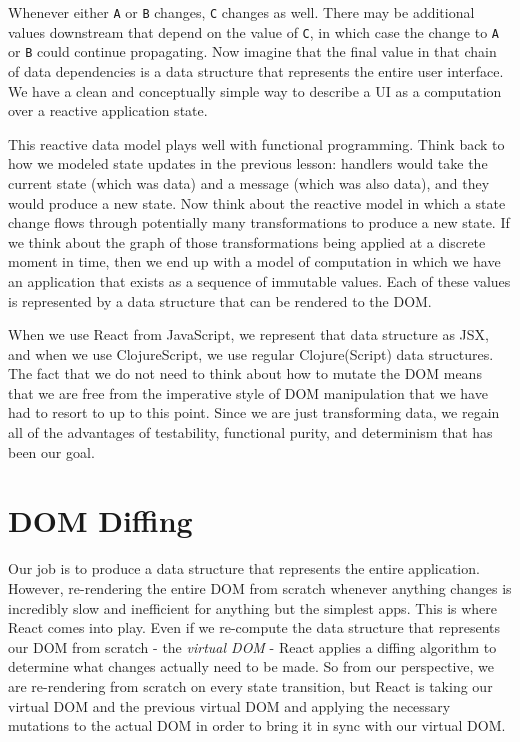 \documentclass[10pt,twoside,openright]{memoir}
\begin{document}
Whenever either \texttt{A} or \texttt{B} changes, \texttt{C} changes as
well. There may be additional values downstream that depend on the value
of \texttt{C}, in which case the change to \texttt{A} or \texttt{B}
could continue propagating. Now imagine that the final value in that
chain of data dependencies is a data structure that represents the
entire user interface. We have a clean and conceptually simple way to
describe a UI as a computation over a reactive application state.

This reactive data model plays well with functional programming. Think
back to how we modeled state updates in the previous lesson: handlers
would take the current state (which was data) and a message (which was
also data), and they would produce a new state. Now think about the
reactive model in which a state change flows through potentially many
transformations to produce a new state. If we think about the graph of
those transformations being applied at a discrete moment in time, then
we end up with a model of computation in which we have an application
that exists as a sequence of immutable values. Each of these values is
represented by a data structure that can be rendered to the DOM.

When we use React from JavaScript, we represent that data structure as
JSX, and when we use ClojureScript, we use regular Clojure(Script) data
structures. The fact that we do not need to think about how to mutate
the DOM means that we are free from the imperative style of DOM
manipulation that we have had to resort to up to this point. Since we
are just transforming data, we regain all of the advantages of
testability, functional purity, and determinism that has been our goal.


\section{DOM Diffing}

Our job is to produce a data structure that represents the entire
application. However, re-rendering the entire DOM from scratch whenever
anything changes is incredibly slow and inefficient for anything but the
simplest apps. This is where React comes into play. Even if we
re-compute the data structure that represents our DOM from scratch - the
\emph{virtual DOM} - React applies a diffing algorithm to determine what
changes actually need to be made. So from our perspective, we are
re-rendering from scratch on every state transition, but React is taking
our virtual DOM and the previous virtual DOM and applying the necessary
mutations to the actual DOM in order to bring it in sync with our
virtual DOM.
\end{document}
